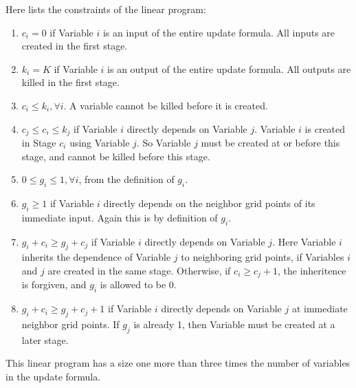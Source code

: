 \documentclass[12pt]{article}
\begin{document}
Here lists the constraints of the linear program:
\begin{enumerate}
\item
$c_i = 0$ if Variable $i$ is an input of the entire update formula.
All inputs are created in the first stage.
\item
$k_i = K$ if Variable $i$ is an output of the entire update formula.
All outputs are killed in the first stage.
\item 
$c_i \le k_i, \forall i$.  A variable cannot be killed before it is created.
\item
$c_j \le c_i \le k_j$ if Variable $i$ directly depends on Variable $j$.  Variable $i$ is created in Stage $c_i$ using Variable $j$.  So Variable $j$ must be created at or before this stage, and cannot be killed before this stage.
\item $0 \le g_i \le 1, \forall i$, from the definition of $g_i$.
\item $g_i \ge 1$ if Variable $i$ directly depends on the neighbor grid points of its immediate input.  Again this is by definition of $g_i$. 
\item $g_i + c_i \ge g_j + c_j$ if Variable $i$ directly depends on Variable $j$.  Here Variable $i$ inherits the dependence of Variable $j$ to neighboring grid points, if Variables $i$ and $j$ are created in the same stage.  Otherwise, if $c_i \ge c_j + 1$, the inheritence is forgiven, and $g_i$ is allowed to be 0.
\item $g_i + c_i \ge g_j + c_j + 1$ if Variable $i$ directly depends on Variable $j$ at immediate neighbor grid points.  If $g_j$ is already 1, then Variable must be created at a later stage.
\end{enumerate}
This linear program has a size one more than three times the number of variables in the update formula.
\end{document}
